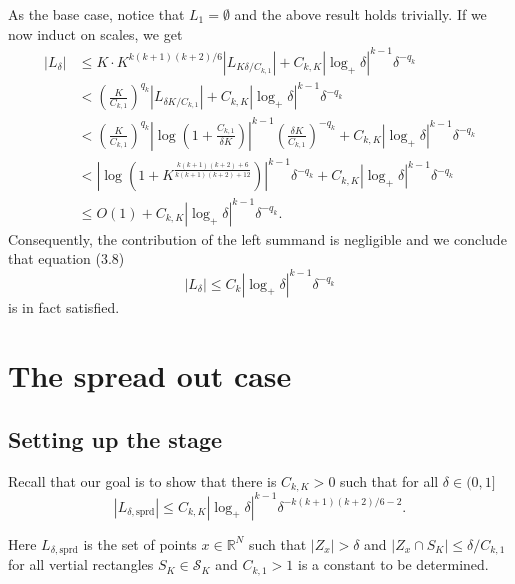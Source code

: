 \documentclass[12pt]{article}
\theoremstyle{definition}
\theoremstyle{remark}
\numberwithin{equation}{section}
\begin{document}
As the base case, notice that $L_1=\emptyset$ and the above result holds trivially. If we now induct on scales, we get 
\begin{align*}
    |L_\delta| &\leq K\cdot K^{k(k+1)(k+2)/6}|L_{K\delta/C_{k,1}}| +C_{k,K}|\log_+\delta|^{k-1}\delta^{-q_k} \\
    &< \left(\frac{K}{C_{k,1}}\right)^{q_k} |L_{\delta K/C_{k,1}}| + C_{k,K}|\log_+\delta|^{k-1}\delta^{-q_k} \\
    &< \left(\frac{K}{C_{k,1}}\right)^{q_k} |\log(1+\frac{C_{k,1}}{\delta K})|^{k-1} \left(\frac{\delta K}{C_{k,1}}\right)^{-q_k} +C_{k,K}|\log_+\delta|^{k-1}\delta^{-q_k} \\
    &< |\log (1+K^\frac{k(k+1)(k+2)+6}{k(k+1)(k+2)+12})|^{k-1}\delta^{-q_k}+C_{k,K}|\log_+\delta|^{k-1}\delta^{-q_k} \\ 
    &\leq O(1) +C_{k,K}|\log_+\delta|^{k-1}\delta^{-q_k}.
\end{align*}
Consequently, the contribution of the left summand is negligible and we conclude that equation (3.8) 
$$|L_\delta| \leq C_k |\log_+\delta|^{k-1}\delta^{-q_k}$$
is in fact satisfied. 

\section{The spread out case}\label{spreadOutCase}
\subsection{Setting up the stage}

Recall that our goal is to show that there is $C_{k,K}>0$ such that for all $\delta\in (0,1]$
\begin{equation}\label{eq_sprd_out}
|L_{\delta,\mathrm{sprd}}| \leq C_{k,K} |\log_+ \delta|^{k-1} \delta^{-k(k+1)(k+2)/6-2}.
\end{equation}

Here $L_{\delta,\mathrm{sprd}}$ is the set of points $x\in\mathbb{R}^N$ such that $|Z_x|>\delta$ and $|Z_x\cap S_K|\leq\delta/C_{k,1}$ for all vertial rectangles $S_K \in \mathcal{S}_K$ and $C_{k,1}>1$ is a constant to be determined. 
\end{document}
